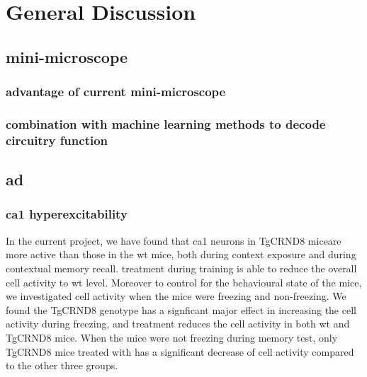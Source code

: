 \chapter{General Discussion}
\begin{comment}
\section{Summary of result}
\subsection{Summary of result}
\subsubsection{Hyperactivity}
\subsubsection{Cellular freezing encoding}
\subsubsection{Network freezing encoding}
\end{comment}
\section{mini-microscope}
\subsection{advantage of current mini-microscope}
\subsection{combination with machine learning methods to decode circuitry function}


\section{\gls{ad}}

\subsection{\gls{ca1} hyperexcitability}
In the current project, we have found that \gls{ca1} neurons in TgCRND8 miceare more active than those in the \gls{wt} mice, both during context exposure and during contextual memory recall. \tglu{} treatment during training is able to reduce the overall cell activity to \gls{wt} level. Moreover to control for the behavioural state of the mice, we investigated cell activity when the mice were freezing and non-freezing. We found the TgCRND8 genotype has a signficant major effect in increasing the cell activity during freezing, and \tglu treatment reduces the cell activity in both \gls{wt} and TgCRND8 mice. When the mice were not freezing during memory test, only TgCRND8 mice treated with \tglu has a significant decrease of cell activity compared to the other three groups. 

